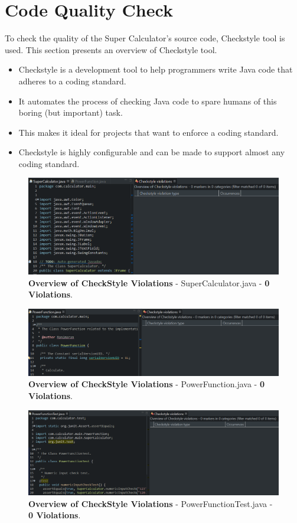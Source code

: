 \documentclass[letterpaper, 11pt]{report}
\begin{document}
\section*{Code Quality Check}
To check the quality of the Super Calculator's source code, Checkstyle tool is used. This section presents an overview of Checkstyle tool.
\begin{itemize}
    \item Checkstyle is a development tool to help programmers write Java code that adheres to a coding standard.
    \item It automates the process of checking Java code to spare humans of this boring (but important) task.
    \item This makes it ideal for projects that want to enforce a coding standard.
    \item Checkstyle is highly configurable and can be made to support almost any coding standard.
\end{itemize}
\begin{figure}
\includegraphics[width=1\textwidth]{Super_Calculator_Checkstyle}
\centering
\caption{ \textbf{Overview of CheckStyle Violations} - SuperCalculator.java - \textbf{0 Violations}.
}
\end{figure}
\begin{figure}
\includegraphics[width=1\textwidth]{Power_Function_Checkstyle}
\centering
\caption{ \textbf{Overview of CheckStyle Violations} - PowerFunction.java - \textbf{0 Violations}.
}
\end{figure}
\begin{figure}
\includegraphics[width=1\textwidth]{Power_Function_TestCases_Checkstyle}
\centering
\caption{ \textbf{Overview of CheckStyle Violations} - PowerFunctionTest.java - \textbf{0 Violations}.
}
\end{figure}
\newpage
\end{document}

